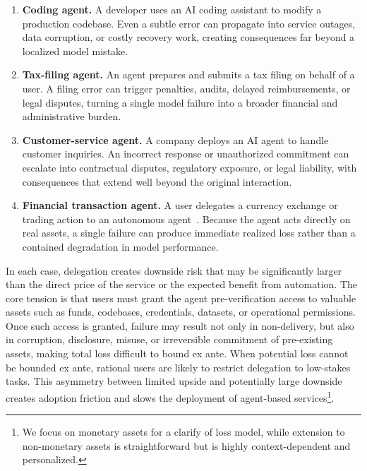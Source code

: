 \documentclass{article} %
\begin{document}
\begin{enumerate}
\item \textbf{Coding agent.} A developer uses an AI coding assistant to modify a production codebase. Even a subtle error can propagate into service outages, data corruption, or costly recovery work, creating consequences far beyond a localized model mistake.

\item \textbf{Tax-filing agent.} An agent prepares and submits a tax filing on behalf of a user. A filing error can trigger penalties, audits, delayed reimbursements, or legal disputes, turning a single model failure into a broader financial and administrative burden.

\item \textbf{Customer-service agent.} A company deploys an AI agent to handle customer inquiries. An incorrect response or unauthorized commitment can escalate into contractual disputes, regulatory exposure, or legal liability, with consequences that extend well beyond the original interaction.

\item \textbf{Financial transaction agent.} A user delegates a currency exchange or trading action to an autonomous agent~\citep{xiao2024tradingagents}. Because the agent acts directly on real assets, a single failure can produce immediate realized loss rather than a contained degradation in model performance.
\end{enumerate}

In each case, delegation creates downside risk that may be significantly larger than the direct price of the service or the expected benefit from automation. The core tension is that users must grant the agent pre-verification access to valuable assets such as funds, codebases, credentials, datasets, or operational permissions. Once such access is granted, failure may result not only in non-delivery, but also in corruption, disclosure, misuse, or irreversible commitment of pre-existing assets, making total loss difficult to bound ex ante. When potential loss cannot be bounded ex ante, rational users are likely to restrict delegation to low-stakes tasks. This asymmetry between limited upside and potentially large downside creates adoption friction and slows the deployment of agent-based services\footnote{We focus on monetary assets for a clarify of loss model, while extension to non-monetary assets is straightforward but is highly context-dependent and personalized.}.
\end{document}
